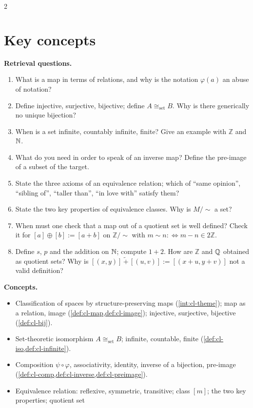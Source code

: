 \begin{paracol}{2}
\section*{Key concepts}
\begin{keyconcepts}
\textbf{Retrieval questions.}
\begin{enumerate}
  \item What is a map in terms of relations, and why is the notation $\varphi(a)$ an abuse of notation?
  \item Define injective, surjective, bijective; define $A\cong_{\mathrm{set}}B$. Why is there generically no unique bijection?
  \item When is a set infinite, countably infinite, finite? Give an example with $\mathbb Z$ and $\mathbb{N}$.
  \item What do you need in order to speak of an inverse map? Define the pre-image of a subset of the target.
  \item State the three axioms of an equivalence relation; which of ``same opinion'', ``sibling of'', ``taller than'', ``in love with''
        satisfy them?
  \item State the two key properties of equivalence classes. Why is $M/{\sim}$ a set?
  \item When must one check that a map out of a quotient set is well defined? Check it for $[a]\oplus[b]:=[a+b]$ on $\mathbb Z/{\sim}$
        with $m\sim n:\Leftrightarrow m-n\in2\mathbb Z$.
  \item Define $s$, $p$ and the addition on $\mathbb{N}$; compute $1+2$. How are $\mathbb Z$ and $\mathbb{Q}$ obtained as quotient sets? Why is
        $[(x,y)]\,\tilde+\,[(u,v)]:=[(x+u,y+v)]$ not a valid definition?
\end{enumerate}
\textbf{Concepts.}
\begin{itemize}
  \item Classification of spaces by structure-preserving maps (\cref{int:cl-theme}); map as a relation, image
        (\cref{def:cl-map,def:cl-image}); injective, surjective, bijective (\cref{def:cl-bij}).
  \item Set-theoretic isomorphism $A\cong_{\mathrm{set}}B$; infinite, countable, finite (\cref{def:cl-iso,def:cl-infinite}).
  \item Composition $\psi\circ\varphi$, associativity, identity, inverse of a bijection, pre-image
        (\cref{def:cl-comp,def:cl-inverse,def:cl-preimage}).
  \item Equivalence relation: reflexive, symmetric, transitive; class $[m]$; the two key properties; quotient set

\end{itemize}
\end{keyconcepts}
\end{paracol}
